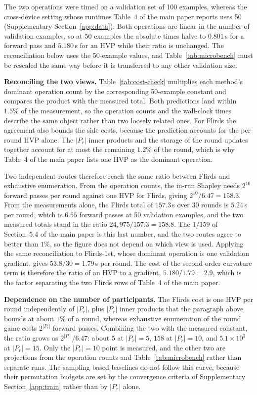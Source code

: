 \documentclass[letterpaper]{article} %
\theoremstyle{plain}
\begin{document}
The two operations were timed on a validation set of 100 examples, whereas the
cross-device setting whose runtimes Table~4 of the main paper reports uses 50
(Supplementary Section~\ref{app:data}). Both operations are linear in the
number of validation examples, so at 50 examples the absolute times halve to
$0.801$\,s for a forward pass and $5.180$\,s for an HVP while their ratio is
unchanged. The reconciliation below uses the 50-example values, and
Table~\ref{tab:microbench} must be rescaled the same way before it is
transferred to any other validation size.

\textbf{Reconciling the two views.} Table~\ref{tab:cost-check} multiplies each
method's dominant operation count by the corresponding 50-example constant and
compares the product with the measured total. Both predictions land within
$1.5\%$ of the measurement, so the operation counts and the wall-clock times
describe the same object rather than two loosely related ones. For Flirds the
agreement also bounds the side costs, because the prediction accounts for the
per-round HVP alone. The $|P_r|$ inner products and the storage of the round
updates together account for at most the remaining $1.2\%$ of the round, which
is why Table~4 of the main paper lists one HVP as the dominant operation.

Two independent routes therefore reach the same ratio between Flirds and
exhaustive enumeration. From the operation counts, the in-run Shapley needs
$2^{10}$ forward passes per round against one HVP for Flirds, giving
$2^{10}/6.47 = 158.3$. From the measurements alone, the Flirds total of
$157.3$\,s over 30 rounds is $5.24$\,s per round, which is $6.55$ forward
passes at 50 validation examples, and the two measured totals stand in the
ratio $24{,}975/157.3 = 158.8$. The $1/159$ of Section~5.4 of the main paper
is this last number, and the two routes agree to better than $1\%$, so the
figure does not depend on which view is used. Applying the same reconciliation
to Flirds-1st, whose dominant operation is one validation gradient, gives
$53.8/30 = 1.79$\,s per round. The cost of the second-order curvature term is
therefore the ratio of an HVP to a gradient, $5.180/1.79 = 2.9$, which is the
factor separating the two Flirds rows of Table~4 of the main paper.

\textbf{Dependence on the number of participants.} The Flirds cost is one HVP
per round independently of $|P_r|$, plus $|P_r|$ inner products that the
paragraph above bounds at about $1\%$ of a round, whereas exhaustive
enumeration of the round game costs $2^{|P_r|}$ forward passes. Combining the
two with the measured constant, the ratio grows as $2^{|P_r|}/6.47$: about $5$
at $|P_r|{=}5$, $158$ at $|P_r|{=}10$, and $5.1\times10^3$ at $|P_r|{=}15$.
Only the $|P_r|{=}10$ point is measured, and the other two are projections
from the operation counts and Table~\ref{tab:microbench} rather than separate
runs. The sampling-based baselines do not follow this curve, because their
permutation budgets are set by the convergence criteria of Supplementary
Section~\ref{app:train} rather than by $|P_r|$ alone.
\end{document}
